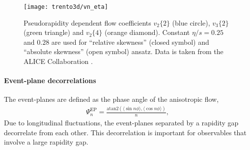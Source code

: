 \begin{figure}
\texttt{[image: trento3d/vn\_eta]}
\caption{Pseudorapidity dependent flow coefficients $v_2\{2\}$ (blue circle), $v_3\{2\}$ (green triangle) and $v_2\{4\}$ (orange diamond).
Constant $\eta/s=0.25$ and $0.28$ are used for ``relative skewness'' (closed symbol) and ``absolute skewness'' (open symbol) ansatz. Data is taken from the ALICE Collaboration \cite{Adam:2016ows}.}
\label{fig:trento:vn_eta}
\end{figure}

\paragraph{Event-plane decorrelations} The event-planes are defined as the phase angle of the anisotropic flow,
\begin{eqnarray}
\Psi_n^\text{EP} = \frac{\text{atan2}(\langle \sin n \phi \rangle, \langle\cos n \phi \rangle)}{n},
\end{eqnarray}
Due to longitudinal fluctuations, the event-planes separated by a rapidity gap decorrelate from each other.
This decorrelation is important for observables that involve a large rapidity gap.

